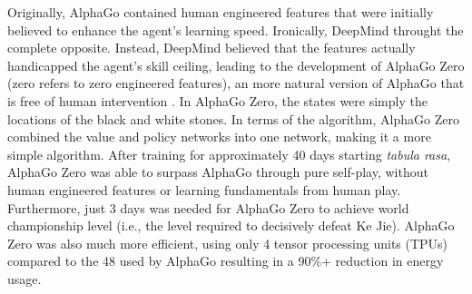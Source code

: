 Originally, AlphaGo contained human engineered features that were initially believed to enhance the agent's learning speed. Ironically, DeepMind throught the complete opposite.  Instead, DeepMind believed that the features actually handicapped the agent's skill ceiling, leading to the development of AlphaGo Zero (zero refers to zero engineered features), an more natural version of AlphaGo that is free of human intervention \cite{alphagozero}. In AlphaGo Zero, the states were simply the locations of the black and white stones. In terms of the algorithm, AlphaGo Zero combined the value and policy networks into one network, making it a more simple algorithm. After training for approximately 40 days starting \textit{tabula rasa}, AlphaGo Zero was able to surpass AlphaGo through pure self-play, without human engineered features or learning fundamentals from human play. Furthermore, just 3 days was needed for AlphaGo Zero to achieve world championship level (i.e., the level required to decisively defeat Ke Jie). AlphaGo Zero was also much more efficient, using only 4 tensor processing units (TPUs) compared to the 48 used by AlphaGo resulting in a 90\%+ reduction in energy usage.

